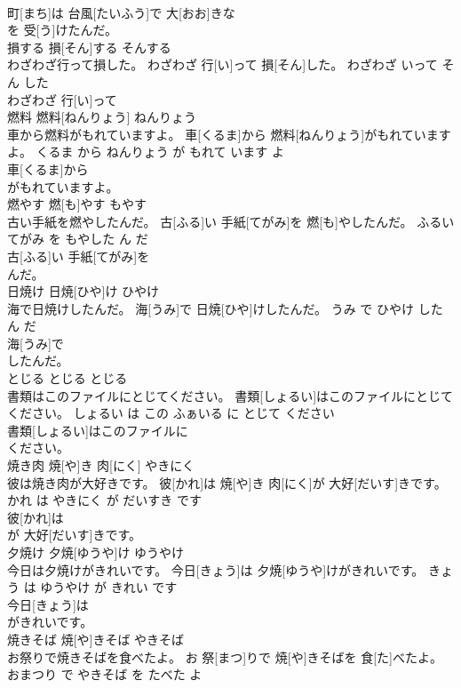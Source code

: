 \documentclass[8pt]{extreport}
\begin{document}
\begin{CJK}{UTF8}{min}
\\	町[まち]は 台風[たいふう]で 大[おお]きな
\\	を 受[う]けたんだ。			
\\	損する	損[そん]する	そんする	
\\	わざわざ行って損した。	わざわざ 行[い]って 損[そん]した。	わざわざ いって そん した	
\\	わざわざ 行[い]って
\\	燃料	燃料[ねんりょう]	ねんりょう	
\\	車から燃料がもれていますよ。	車[くるま]から 燃料[ねんりょう]がもれていますよ。	くるま から ねんりょう が もれて います よ	
\\	車[くるま]から
\\	がもれていますよ。			
\\	燃やす	燃[も]やす	もやす	
\\	古い手紙を燃やしたんだ。	古[ふる]い 手紙[てがみ]を 燃[も]やしたんだ。	ふるい てがみ を もやした ん だ	
\\	古[ふる]い 手紙[てがみ]を
\\	んだ。			
\\	日焼け	日焼[ひや]け	ひやけ	
\\	海で日焼けしたんだ。	海[うみ]で 日焼[ひや]けしたんだ。	うみ で ひやけ した ん だ	
\\	海[うみ]で
\\	したんだ。			
\\	とじる	とじる	とじる	
\\	書類はこのファイルにとじてください。	書類[しょるい]はこのファイルにとじてください。	しょるい は この ふぁいる に とじて ください	
\\	書類[しょるい]はこのファイルに
\\	ください。			
\\	焼き肉	焼[や]き 肉[にく]	やきにく	
\\	彼は焼き肉が大好きです。	彼[かれ]は 焼[や]き 肉[にく]が 大好[だいす]きです。	かれ は やきにく が だいすき です	
\\	彼[かれ]は
\\	が 大好[だいす]きです。			
\\	夕焼け	夕焼[ゆうや]け	ゆうやけ	
\\	今日は夕焼けがきれいです。	今日[きょう]は 夕焼[ゆうや]けがきれいです。	きょう は ゆうやけ が きれい です	
\\	今日[きょう]は
\\	がきれいです。			
\\	焼きそば	焼[や]きそば	やきそば	
\\	お祭りで焼きそばを食べたよ。	お 祭[まつ]りで 焼[や]きそばを 食[た]べたよ。	おまつり で やきそば を たべた よ	

\end{CJK}
\end{document}
